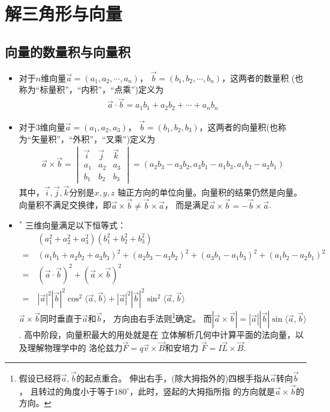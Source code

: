 \chapter{解三角形与向量}

\section{向量的数量积与向量积}
\begin{itemize}[leftmargin=\inteval{\myitemleftmargin}pt,itemsep=
   \inteval{\myitemitempsep}pt,topsep=\inteval{\myitemtopsep}pt]
\item 对于$ n $维向量$ \vec{a}=(a_1,a_2,\cdots,a_n) $，
$ \vec{b}=(b_1,b_2,\cdots,b_n) $，这两者的数量积
(也称为“标量积”，“内积”，“点乘”)定义为
\begin{gather*}
    \vec{a}\cdot \vec{b}=a_1b_1+a_2b_2+\cdots+a_nb_n
\end{gather*}

\item 对于$ 3 $维向量$ \vec{a}=(a_1,a_2,a_3) $，
$ \vec{b}=(b_1,b_2,b_3) $，这两者的向量积(也称为“矢量积”，“外积”，“叉乘”)定义为
\begin{align}\label{三维向量叉乘}
    \vec{a}\times\vec{b} =
    \begin{vmatrix}
        \vec{i} & \vec{j} & \vec{k} \\
        a_1 & a_2 & a_3 \\
        b_1 & b_2 & b_3
    \end{vmatrix}
    =(a_2b_3-a_3b_2,a_3b_1-a_1b_3, a_1b_2-a_2b_1)
\end{align}
其中，$ \vec{i},\vec{j},\vec{k} $分别是$ x,y,z $
轴正方向的单位向量。向量积的结果仍然是向量。
向量积不满足交换律，即$ \vec{a}\times
\vec{b}\neq \vec{b}\times\vec{a} $，
而是满足$ \vec{a}\times \vec{b}=-\vec{b}
\times\vec{a} $. 

\item $^*$ 三维向量满足以下恒等式：
\begin{align*}
    &\ (a_1^2+a_2^2+a_3^2)(b_1^2+b_2^2+b_3^2)\\
    =&\  (a_1b_1+a_2b_2+a_3b_3)^2+
    (a_2b_3-a_3b_2)^2+(a_3b_1-a_1b_3)^2+(a_1b_2-a_2b_1)^2 \\
    =&\ (\vec{a}\cdot \vec{b})^2+(\vec{a}\times\vec{b})^2 \\
    =&\ |\vec{a}|^2|\vec{b}|^2\cos^2\langle\vec{a},\vec{b}\rangle 
    +|\vec{a}|^2|\vec{b}|^2\sin^2\langle\vec{a},\vec{b}\rangle
\end{align*} 
$ \vec{a}\times\vec{b} $同时垂直于$ \vec{a} $和$ \vec{b} $，
方向由右手法则\footnote{
    假设已经将$ \vec{a},\vec{b} $的起点重合。
    伸出右手，(除大拇指外的)四根手指从$ \vec{a} $转向$ \vec{b} $，
    且转过的角度小于等于$ 180^{\circ} $，此时，竖起的大拇指所指
    的方向就是$ \vec{a}\times\vec{b} $的方向。}确定。
而$ |\vec{a}\times\vec{b}|=|\vec{a}||\vec{b}|\sin\langle\vec{a},
\vec{b}\rangle $. 高中阶段，向量积最大的用处就是在
立体解析几何中计算平面的法向量，以及理解物理学中的
洛伦兹力$ \vec{F}=q\vec{v}\times \vec{B} $和安培力
$ \vec{F}=I\vec{L}\times \vec{B} $. 


\end{itemize}
